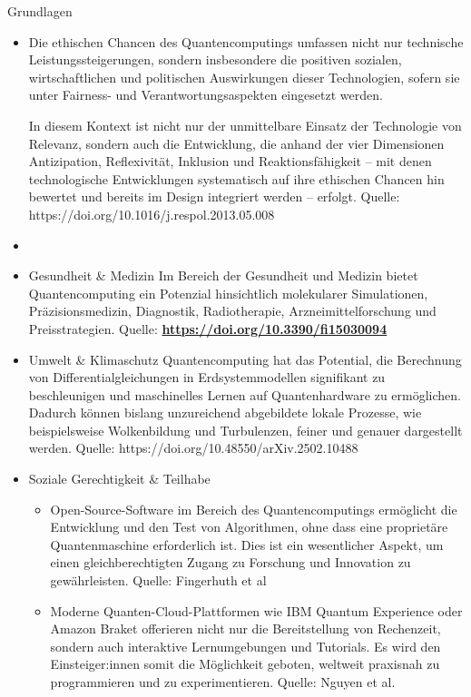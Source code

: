 \item Grundlagen
\begin{itemize}
    \item Die ethischen Chancen des Quantencomputings umfassen nicht nur technische Leistungssteigerungen, sondern insbesondere die positiven sozialen, wirtschaftlichen und politischen Auswirkungen dieser Technologien, sofern sie unter Fairness- und Verantwortungsaspekten eingesetzt werden. \cite{arrow_holistic_2023}

In diesem Kontext ist nicht nur der unmittelbare Einsatz der Technologie von Relevanz, sondern auch die Entwicklung, die anhand der vier Dimensionen Antizipation, Reflexivität, Inklusion und Reaktionsfähigkeit – mit denen technologische Entwicklungen systematisch auf ihre ethischen Chancen hin bewertet und bereits im Design integriert werden – erfolgt. Quelle: https://doi.org/10.1016/j.respol.2013.05.008

\item \item Gesundheit \& Medizin
Im Bereich der Gesundheit und Medizin bietet Quantencomputing ein Potenzial hinsichtlich molekularer Simulationen, Präzisionsmedizin, Diagnostik, Radiotherapie, Arzneimittelforschung und Preisstrategien. Quelle: \href{https://doi.org/10.3390/fi15030094}{\textbf{https://doi.org/10.3390/fi15030094}}

\item Umwelt \& Klimaschutz
Quantencomputing hat das Potential, die Berechnung von Differentialgleichungen in Erdsystemmodellen signifikant zu beschleunigen und maschinelles Lernen auf Quantenhardware zu ermöglichen. Dadurch können bislang unzureichend abgebildete lokale Prozesse, wie beispielsweise Wolkenbildung und Turbulenzen, feiner und genauer dargestellt werden. Quelle: https://doi.org/10.48550/arXiv.2502.10488

\item Soziale Gerechtigkeit \& Teilhabe
\begin{itemize}
    \item Open-Source-Software im Bereich des Quantencomputings ermöglicht die Entwicklung und den Test von Algorithmen, ohne dass eine proprietäre Quantenmaschine erforderlich ist. Dies ist ein wesentlicher Aspekt, um einen gleichberechtigten Zugang zu Forschung und Innovation zu gewährleisten. Quelle: Fingerhuth et al
    \item Moderne Quanten-Cloud-Plattformen wie IBM Quantum Experience oder Amazon Braket offerieren nicht nur die Bereitstellung von Rechenzeit, sondern auch interaktive Lernumgebungen und Tutorials. Es wird den Einsteiger:innen somit die Möglichkeit geboten, weltweit praxisnah zu programmieren und zu experimentieren. Quelle: Nguyen et al.


\end{itemize}
\end{itemize}
